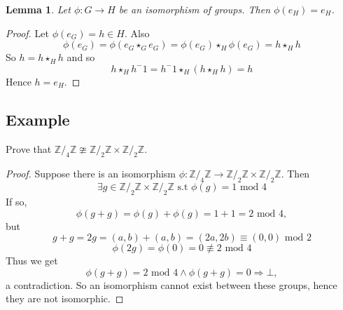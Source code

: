 \documentclass[12pt]{article}
\newtheorem{lemma}{Lemma}
\begin{document}
\begin{lemma}
    Let \(\phi : G\rightarrow H\) be an isomorphism of groups. 
    Then \(\phi(e_H) = e_H\).
\end{lemma}
\begin{proof}
    Let \(\phi (e_G) = h \in H\). Also 
    \[
        \phi(e_G) = \phi(e_G \star_G e_G) 
        = \phi(e_G) \star_H \phi(e_G)
        = h \star_H h 
    \]
    So \(h = h \star_H h\) and so 
    \[
        h \star_H h^-1 = h^-1 \star_H (h \star_H h) = h
    \]
    Hence \(h = e_H\).
    
\end{proof}

\subsection*{Example} 
Prove that \(\mathbb Z/_4 \mathbb Z \ncong 
\mathbb Z/_2 \mathbb Z \times \mathbb Z/_2 \mathbb Z\). 
\begin{proof}
    Suppose there is an isomorphism  
    \(
        \phi: \mathbb Z/_4 \mathbb Z \rightarrow
        \mathbb Z/_2 \mathbb Z \times \mathbb Z/_2 \mathbb Z
    \). 
    Then
    \[
        \exists g \in \mathbb Z/_2\mathbb Z \times \mathbb Z/_2\mathbb Z\text{ s.t } 
        \phi (g) = 1 \text{ mod } 4
    \] 
    If so, 
    \[ 
        \phi(g+g) = \phi(g)+\phi(g) = 1 + 1 = 2 \text{ mod } 4,
    \]
    but 
    \[ 
        g+g = 2g = (a,b)+(a,b) = (2a,2b) \equiv (0,0) \text{ mod } 2 
    \]
    \[ 
        \phi(2g) = \phi(0) = 0 \not\equiv 2 \text{ mod } 4
    \] 
    Thus we get 
    \[ 
        \phi(g+g) = 2 \text{ mod } 4 \land \phi(g+g) = 0 \Rightarrow \bot,
    \]
    a contradiction. So an isomorphism cannot exist between these groups, 
    hence they are not isomorphic.
\end{proof}
\end{document}
